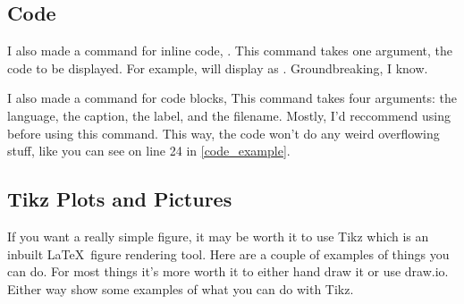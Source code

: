 \newpage

\subsection{Code}

I also made a command for inline code, \code{\code{}}. This command takes one argument, the code to be displayed. For example,  will display as . Groundbreaking, I know. 

I also made a command for code blocks, \code{\codeblock{}{}} 
This command takes four arguments: the language, the caption, the label, and the filename. Mostly, I'd reccommend using \code{\onecolumn} before using this command. This way, the code won't do any weird overflowing stuff, like you can see on line 24 in \cref{code_example}.


\subsection{Tikz Plots and Pictures}

If you want a really simple figure, it may be worth it to use Tikz which is an inbuilt \LaTeX \  figure rendering tool.
Here are a couple of examples of things you can do. For most things it's more worth it to either hand draw it or use draw.io. Either way  show some examples of what you can do with Tikz.

